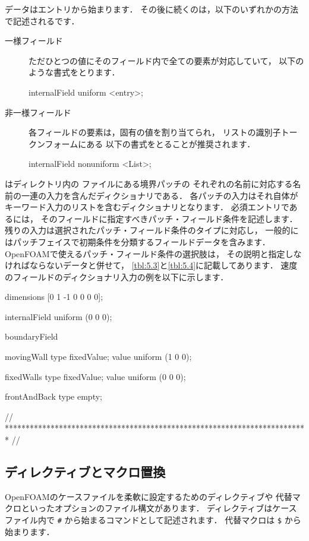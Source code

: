 データはエントリから始まります．
その後に続くのは，以下のいずれかの方法で記述されるです．
\begin{description}
 \item[一様フィールド]
            ただひとつの値にそのフィールド内で全ての要素が対応していて，
            以下のような書式をとります．
\begin{OFverbatim}[file]
internalField uniform <entry>;
\end{OFverbatim}
 \item[非一様フィールド]
            各フィールドの要素は，固有の値を割り当てられ，
            リストの識別子トークンフォームにある
            以下の書式をとることが推奨されます．
\begin{OFverbatim}[file]
internalField nonuniform <List>;
\end{OFverbatim}
\end{description}
はディレクトリ内の
ファイルにある境界パッチの
それぞれの名前に対応する名前の一連の入力を含んだディクショナリである．
各パッチの入力はそれ自体がキーワード入力のリストを含むディクショナリとなります．
必須エントリであるには，
そのフィールドに指定すべきパッチ・フィールド条件を記述します．
残りの入力は選択されたパッチ・フィールド条件のタイプに対応し，
一般的にはパッチフェイスで初期条件を分類するフィールドデータを含みます．
OpenFOAMで使えるパッチ・フィールド条件の選択肢は，
その説明と指定しなければならないデータと併せて，
\autoref{tbl:5.3}と\autoref{tbl:5.4}に記載してあります．
速度のフィールドのディクショナリ入力の例を以下に示します．
\begin{OFverbatim}[file, linenum=17]
dimensions      [0 1 -1 0 0 0 0];

internalField   uniform (0 0 0);

boundaryField
{
    movingWall
    {
        type            fixedValue;
        value           uniform (1 0 0);
    }

    fixedWalls
    {
        type            fixedValue;
        value           uniform (0 0 0);
    }

    frontAndBack
    {
        type            empty;
    }
}

// ************************************************************************* //
\end{OFverbatim}


\subsection{ディレクティブとマクロ置換}
\label{ssec:4.2.9}
OpenFOAMのケースファイルを柔軟に設定するためのディレクティブや
代替マクロといったオプションのファイル構文があります．
ディレクティブはケースファイル内で \verb|#| から始まるコマンドとして記述されます．
代替マクロは \verb|$| から始まります．%

